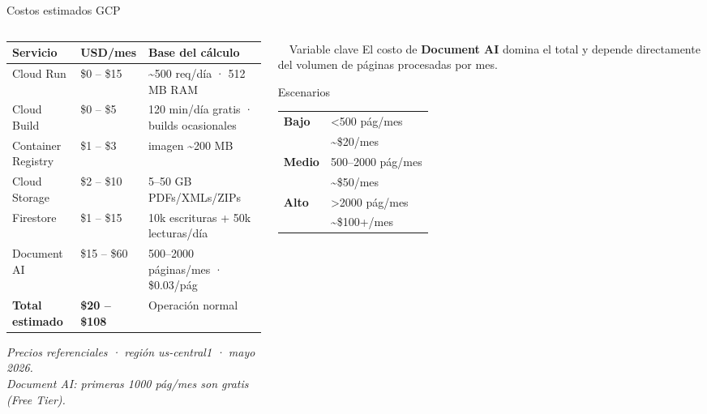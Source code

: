 \documentclass[aspectratio=169]{beamer}
\begin{document}
\begin{frame}{Costos estimados GCP}
\begin{columns}[T]
\begin{column}{0.58\textwidth}
  \begin{tabular}{@{}p{2.8cm}p{2.2cm}p{3cm}@{}}
    \toprule
    \textbf{Servicio} & \textbf{USD/mes} & \textbf{Base del cálculo} \\
    \midrule
    Cloud Run       & \$0 -- \$15  & \textasciitilde500 req/día · 512 MB RAM \\
    Cloud Build     & \$0 -- \$5   & 120 min/día gratis · builds ocasionales \\
    Container Registry & \$1 -- \$3 & imagen \textasciitilde200 MB \\
    Cloud Storage   & \$2 -- \$10  & 5--50 GB PDFs/XMLs/ZIPs \\
    Firestore       & \$1 -- \$15  & 10k escrituras + 50k lecturas/día \\
    Document AI     & \$15 -- \$60 & 500--2000 páginas/mes · \$0.03/pág \\
    \midrule
    \textbf{Total estimado} & \textbf{\$20 -- \$108} & Operación normal \\
    \bottomrule
  \end{tabular}

  \vspace{0.3cm}
  \footnotesize
  \textit{Precios referenciales · región us-central1 · mayo 2026.}\\
  \textit{Document AI: primeras 1000 pág/mes son gratis (Free Tier).}
\end{column}

\begin{column}{0.38\textwidth}
  \begin{alertblock}{\faExclamationTriangle\ \ Variable clave}
    El costo de \textbf{Document AI} domina el total y depende directamente del volumen de páginas procesadas por mes.
  \end{alertblock}

  \vspace{0.4cm}

  \begin{block}{Escenarios}
    \footnotesize
    \begin{tabular}{ll}
      \textbf{Bajo}  & \textless 500 pág/mes \\
                     & \textasciitilde \$20/mes \\[4pt]
      \textbf{Medio} & 500--2000 pág/mes \\
                     & \textasciitilde \$50/mes \\[4pt]
      \textbf{Alto}  & \textgreater 2000 pág/mes \\
                     & \textasciitilde \$100+/mes \\
    \end{tabular}
  \end{block}


\end{column}
\end{columns}
\end{frame}
\end{document}

